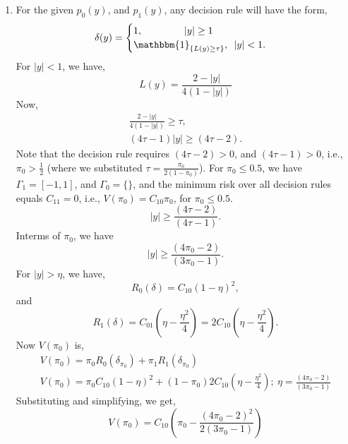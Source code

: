 \documentclass[a4paper,english,10pt]{article}
\begin{document}
\begin{enumerate}[label=(\alph{*}).]
\item For the given $p_0(y)$, and $p_1(y)$, any decision rule will have the form,
\begin{equation*}
\delta(y)=\begin{cases}
1,\hspace{42pt}|y|\geq 1\\
\mathbbm{1}_{\{L(y)\geq \tau\}},\hspace{5pt} |y|<1.
\end{cases}
\end{equation*}
For $|y|<1$, we have,
\begin{equation*}
	L(y)=\frac{2-|y|}{4(1-|y|)}
\end{equation*}
Now,
\begin{eqnarray*}
	\frac{2-|y|}{4(1-|y|)} \geq \tau,\\
	(4\tau-1)|y|\geq (4\tau-2).
\end{eqnarray*}
Note that the decision rule requires $(4\tau-2)>0$, and $(4\tau-1)>0$, i.e., $\pi_0>\frac{1}{2}$ (where we substituted $\tau=\frac{\pi_0}{2(1-\pi_0)}$). For $\pi_0\leq 0.5$, we have $\Gamma_1=[-1,1]$, and $\Gamma_0=\{\}$, and the minimum risk over all decision rules equals $C_{11}=0$, i.e., $V(\pi_0)=C_{10}\pi_0$, for $\pi_0\leq 0.5$.
\begin{equation*}
	|y|\geq \frac{(4\tau-2)}{(4\tau-1)}.
\end{equation*}
Interms of $\pi_0$, we have 
\begin{equation*}
	|y|\geq \frac{(4\pi_0-2)}{(3\pi_0-1)}.
\end{equation*}
For $|y|>\eta$, we have,
\begin{equation*}
R_0(\delta)=C_{10} (1-\eta)^2,
\end{equation*}
and
\begin{equation*}
R_1(\delta)=C_{01} (\eta-\frac{\eta^2}{4})=2C_{10} (\eta-\frac{\eta^2}{4}).
\end{equation*}
Now $V(\pi_0)$ is,
\begin{eqnarray*}
	V(\pi_0)=\pi_0 R_0(\delta_{\pi_0})+\pi_1 R_1(\delta_{\pi_0})\\
	V(\pi_0)=\pi_0 C_{10} (1-\eta)^2+(1-\pi_0) 2C_{10} (\eta-\frac{\eta^2}{4});~\eta=\frac{(4\pi_0-2)}{(3\pi_0-1)}
\end{eqnarray*}
Substituting and simplifying, we get,
\begin{equation*}
V(\pi_0)=C_{10} \left(\pi_0-\frac{(4\pi_0-2)^2}{2(3\pi_0-1)}\right)
\end{equation*}

\end{enumerate}
\end{document}
